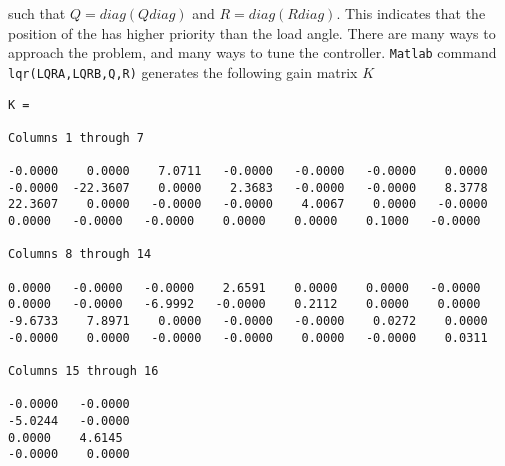 such that $ Q = diag(Qdiag) $ and $ R=diag(Rdiag) $. This indicates that the position of the  has higher priority than the load angle. There are many ways to approach the problem, and many ways to tune the controller.
\texttt{Matlab} command \texttt{lqr(LQRA,LQRB,Q,R)} generates the following gain matrix $ K $
\begin{lstlisting}
K =

Columns 1 through 7

-0.0000    0.0000    7.0711   -0.0000   -0.0000   -0.0000    0.0000
-0.0000  -22.3607    0.0000    2.3683   -0.0000   -0.0000    8.3778
22.3607    0.0000   -0.0000   -0.0000    4.0067    0.0000   -0.0000
0.0000   -0.0000   -0.0000    0.0000    0.0000    0.1000   -0.0000

Columns 8 through 14

0.0000   -0.0000   -0.0000    2.6591    0.0000    0.0000   -0.0000
0.0000   -0.0000   -6.9992   -0.0000    0.2112    0.0000    0.0000
-9.6733    7.8971    0.0000   -0.0000   -0.0000    0.0272    0.0000
-0.0000    0.0000   -0.0000   -0.0000    0.0000   -0.0000    0.0311

Columns 15 through 16

-0.0000   -0.0000
-5.0244   -0.0000
0.0000    4.6145
-0.0000    0.0000
\end{lstlisting}





